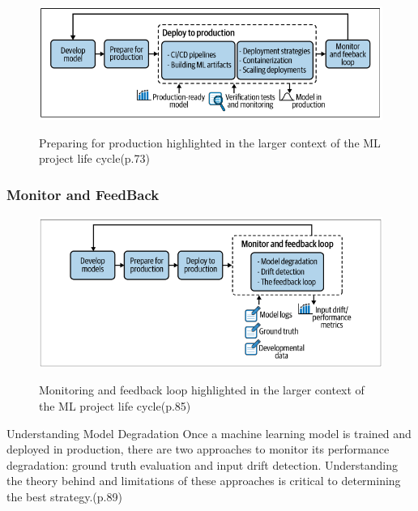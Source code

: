 \begin{figure}[!htbp]
    \caption{Preparing for production highlighted in the larger context of the ML project
    life cycle\cite{treveil2020introducing}(p.73)}
    \centering
    \includegraphics[scale=0.5]{images/deploy-prod}
    \label{fig:deploy-prod}
\end{figure}


\subsubsection{Monitor and FeedBack}

\begin{figure}[!htbp]
    \caption{Monitoring and feedback loop highlighted in the larger context of the ML
    project life cycle\cite{treveil2020introducing}(p.85)}
    \centering
    \includegraphics[scale=0.5]{images/monitor-intro}
    \label{fig:monitor-intro}
\end{figure}



Understanding Model Degradation
Once a machine learning model is trained and deployed in production, there are two
approaches to monitor its performance degradation: ground truth evaluation and
input drift detection. Understanding the theory behind and limitations of these
approaches is critical to determining the best strategy.\cite{treveil2020introducing}(p.89)

